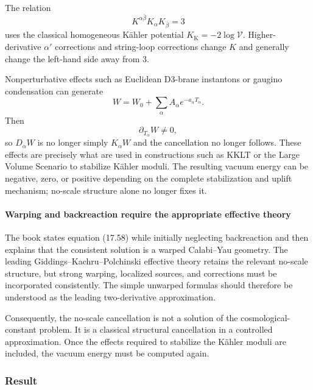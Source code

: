 \documentclass[
  10pt,
  a4paper,
  openany]{book}
\begin{document}
The relation \[
K^{\alpha\bar\beta}K_\alpha K_{\bar\beta}=3
\] uses the classical homogeneous Kähler potential
\(K_{\mathrm K}=-2\log\mathcal V\). Higher-derivative \(\alpha'\)
corrections and string-loop corrections change \(K\) and generally
change the left-hand side away from \(3\).

Nonperturbative effects such as Euclidean D3-brane instantons or gaugino
condensation can generate \[
W
=W_0+\sum_\alpha A_\alpha e^{-a_\alpha T_\alpha}.
\] Then \[
\partial_{T_\alpha}W\neq0,
\] so \(D_\alpha W\) is no longer simply \(K_\alpha W\) and the
cancellation no longer follows. These effects are precisely what are
used in constructions such as KKLT or the Large Volume Scenario to
stabilize Kähler moduli. The resulting vacuum energy can be negative,
zero, or positive depending on the complete stabilization and uplift
mechanism; no-scale structure alone no longer fixes it.

\paragraph{Warping and backreaction require the appropriate effective
theory}\label{warping-and-backreaction-require-the-appropriate-effective-theory}

The book states equation (17.58) while initially neglecting backreaction
and then explains that the consistent solution is a warped Calabi--Yau
geometry. The leading Giddings--Kachru--Polchinski effective theory
retains the relevant no-scale structure, but strong warping, localized
sources, and corrections must be incorporated consistently. The simple
unwarped formulas should therefore be understood as the leading
two-derivative approximation.

Consequently, the no-scale cancellation is not a solution of the
cosmological-constant problem. It is a classical structural cancellation
in a controlled approximation. Once the effects required to stabilize
the Kähler moduli are included, the vacuum energy must be computed
again.

\subsubsection{Result}\label{result-35}
\end{document}
